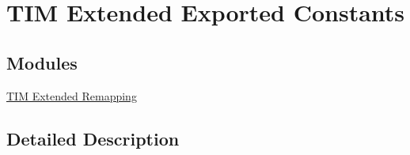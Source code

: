 \hypertarget{group___t_i_m_ex___exported___constants}{}\section{T\+IM Extended Exported Constants}
\label{group___t_i_m_ex___exported___constants}
\subsection*{Modules}
\begin{DoxyCompactItemize}
\item 
\hyperlink{group___t_i_m_ex___remap}{T\+I\+M Extended Remapping}
\end{DoxyCompactItemize}


\subsection{Detailed Description}
